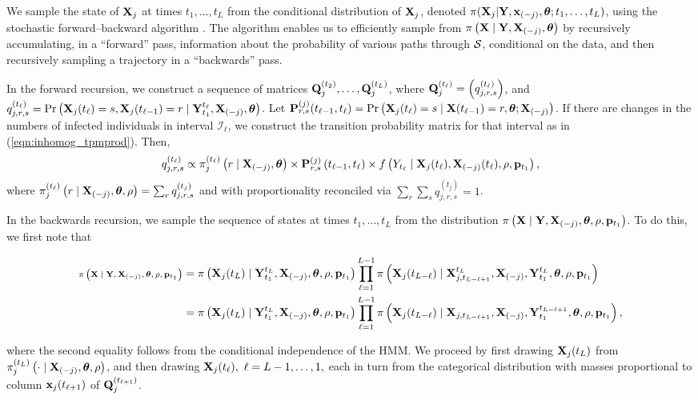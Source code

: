 We sample the state of $ \mathbf{X}_j $ at times $ t_1,\dots,t_L $ from the conditional distribution of $ \mathbf{X}_j $, denoted $ \pi(\mathbf{X}_j | \mathbf{Y},\mathbf{x}_{(-j)}, \boldsymbol{\theta}; t_1,\dots,t_L) $, using the stochastic forward--backward algorithm \cite{scott2002}. The algorithm enables us to efficiently sample from $ \pi\left (\mathbf{X} \mid \mathbf{Y}, \mathbf{X}_{(-j)}, \boldsymbol{\theta}\right ) $ by recursively accumulating, in a ``forward'' pass, information about the probability of various paths through $ \mathcal{S} $, conditional on the data, and then recursively sampling a trajectory in a ``backwards'' pass. 

In the forward recursion, we construct a sequence of matrices $ \mathbf{Q}^{(t_2)}_j,\dots,\mathbf{Q}^{(t_L)}_j $, where $ \mathbf{Q}^{(t_\ell)}_j = \left (q_{j,r,s}^{(t_\ell)}\right )$, and $ q_{j,r,s}^{(t_\ell)} = \Pr\left (\mathbf{X}_j(t_\ell) = s, \mathbf{X}_j(t_{\ell - 1}) = r \mid \mathbf{Y}_{t_1}^{t_{\ell}},\mathbf{X}_{(-j)},\boldsymbol{\theta} \right )$. Let $ \mathbf{P}^{(j)}_{r,s}(t_{\ell - 1},t_\ell) = \Pr\left (\mathbf{X}_j(t_\ell) = s \mid \mathbf{X}(t_{\ell-1})=r, \boldsymbol{\theta}; \mathbf{X}_{(-j)}\right ) $. If there are changes in the numbers of infected individuals in interval $ \mathcal{I}_\ell $, we construct the transition probability matrix for that interval as in (\ref{eqn:inhomog_tpmprod}). Then, 
\begin{equation}
q_{j,r,s}^{(t_\ell)} \propto \pi_{j}^{(t_\ell)}\left (r \mid \mathbf{X}_{(-j)}, \boldsymbol{\theta}\right ) \times \mathbf{P}^{(j)}_{r,s}\left (t_{\ell-1},t_\ell\right ) \times f\left (Y_{t_\ell} \mid \mathbf{X}_j(t_\ell),\mathbf{X}_{(-j)}(t_\ell), \rho, \mathbf{p}_{t_1}\right ),	
\end{equation}
where $  \pi_{j}^{(t_\ell)}\left (r \mid \mathbf{X}_{(-j)}, \boldsymbol{\theta}, \rho\right ) = \sum_r q_{j,r,s}^{(t_j)}$ and with proportionality reconciled via $ \sum_r\sum_s q_{j,r,s}^{(t_j)}=1 $.

In the backwards recursion, we sample the sequence of states at times $ t_1,\dots,t_L $ from the distribution $ \pi\left (\mathbf{X} \mid \mathbf{Y}, \mathbf{X}_{(-j)},\boldsymbol{\theta}, \rho,\mathbf{p}_{t_1}\right )$. To do this, we first note that\vspace{-0.25in}

\begin{scriptsize}
	\begin{align*}\scriptsize
	\pi\left (\mathbf{X} \mid \mathbf{Y}, \mathbf{X}_{(-j)},\boldsymbol{\theta}, \rho,\mathbf{p}_{t_1}\right ) &= \pi\left (\mathbf{X}_j(t_L) \mid \mathbf{Y}_{t_1}^{t_L}, \mathbf{X}_{(-j)},\boldsymbol{\theta},\rho, \mathbf{p}_{t_1}\right ) \prod_{\ell = 1}^{L-1}\pi \left (\mathbf{X}_j(t_{L-\ell}) \mid \mathbf{X}_{j,t_{L-\ell+1}}^{t_L}, \mathbf{X}_{(-j)}, \mathbf{Y}_{t_1}^{t_L}, \boldsymbol{\theta}, \rho, \mathbf{p}_{t_1}\right )\\
	&= \pi\left (\mathbf{X}_j(t_L) \mid \mathbf{Y}_{t_1}^{t_L}, \mathbf{X}_{(-j)},\boldsymbol{\theta},\rho, \mathbf{p}_{t_1}\right ) \prod_{\ell = 1}^{L-1}\pi \left (\mathbf{X}_j(t_{L-\ell}) \mid \mathbf{X}_{j,t_{L-\ell+1}}, \mathbf{X}_{(-j)}, \mathbf{Y}_{t_1}^{t_{L-\ell+1}}, \boldsymbol{\theta}, \rho, \mathbf{p}_{t_1}\right ),
	\end{align*}
\end{scriptsize} 
where the second equality follows from the conditional independence of the HMM. We proceed by first drawing $ \mathbf{X}_j(t_L) $ from $ \pi_j^{(t_L)}\left (\cdot \mid \mathbf{X}_{(-j)}, \boldsymbol{\theta},\rho\right  ) $, and then drawing $ \mathbf{X}_j(t_\ell),\ \ell = L-1,\dots,1, $ each in turn from the categorical distribution with masses proportional to column $ \mathbf{x}_j(t_{\ell+1}) $ of $ \mathbf{Q}_j^{(t_{\ell+1})} $. 

